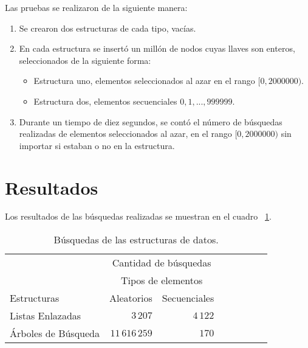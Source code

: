 \documentclass[twocolumn,english,spanish,journal]{IEEEtran}
\providecommand{\tabularnewline}{\\}
\begin{document}
Las pruebas se realizaron de la siguiente manera:\newline

\begin{enumerate}
	\item Se crearon dos estructuras de cada tipo, vacías.\newline
	
	\item En cada estructura se insertó un millón de nodos cuyas llaves son enteros, seleccionados de la siguiente forma:\newline 
	
	\begin{itemize}
	\item Estructura uno, elementos seleccionados al azar en el rango $[0, 2000000)$.\newline
	\item Estructura dos, elementos secuenciales $0, 1, ..., 999999$.\newline
	\end{itemize}
	
	\item Durante un tiempo de diez segundos, se contó el número de búsquedas realizadas de elementos seleccionados al azar, en el rango $[0, 2000000)$ sin importar si estaban o no en la estructura.
\end{enumerate}

\section{Resultados}
Los resultados de las búsquedas realizadas se muestran en el cuadro ~\ref{tab:tiempos}.

\begin{table}
	\caption{Búsquedas de las estructuras de datos.\label{tab:tiempos}}
	\centering{}
	
	\begin{tabular}{lrrrrrrr}
		\toprule 
		                                 & \multicolumn{2}{c}{Cantidad de búsquedas}\tabularnewline
		                                   \cmidrule{2-3}      
		                                 & \multicolumn{2}{c}{Tipos de elementos}\tabularnewline
	 	                                   \cmidrule{2-3} 
		Estructuras         & Aleatorios & Secuenciales \tabularnewline 
		\midrule 
		Listas Enlazadas    & $3\,207$  & $4\,122$    \centering \tabularnewline	
		\midrule
		Árboles de Búsqueda & $11\,616\,259$  & $170$   \centering  \tabularnewline 
		\bottomrule
	\end{tabular}
\end{table}
\end{document}
